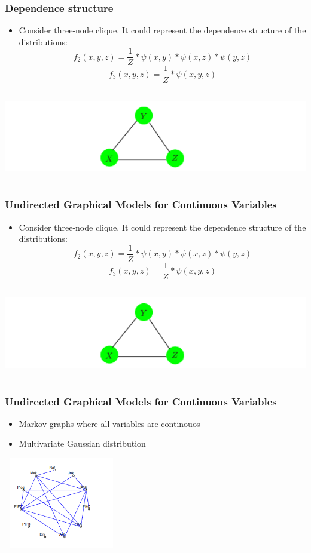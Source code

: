 \documentclass{beamer}
\begin{document}
\begin{frame}
\frametitle{Dependence structure}
\begin{itemize}
\item Consider three-node clique. It could represent the dependence structure of the distributions:
\begin{equation}
f_2(x,y,z)=\frac{1}{Z}*\psi(x,y)*\psi(x,z)*\psi(y,z)
\end{equation}
\begin{equation}
f_3(x,y,z)=\frac{1}{Z}*\psi(x,y,z)
\end{equation}
\end{itemize}
\includegraphics[width=15cm, height=4cm]{Graph}
\end{frame}
\begin{frame}
\frametitle{Undirected Graphical Models for Continuous Variables}
\begin{itemize}
\item Consider three-node clique. It could represent the dependence structure of the distributions:
\begin{equation}
f_2(x,y,z)=\frac{1}{Z}*\psi(x,y)*\psi(x,z)*\psi(y,z)
\end{equation}
\begin{equation}
f_3(x,y,z)=\frac{1}{Z}*\psi(x,y,z)
\end{equation}
\end{itemize}
\includegraphics[width=15cm, height=4cm]{Graph}
\end{frame}
\begin{frame}
\frametitle{Undirected Graphical Models for Continuous Variables}
\begin{itemize}
\item Markov graphs where all variables are continouos
\item Multivariate Gaussian distribution
\end{itemize}
\includegraphics[width=5cm, height=4cm]{Gaussian_image}
\end{frame}
\end{document}
